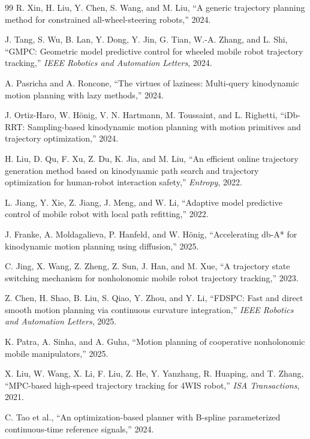 \begin{thebibliography}{99}
R. Xin, H. Liu, Y. Chen, S. Wang, and M. Liu, ``A generic trajectory planning method for constrained all-wheel-steering robots,'' 2024.

J. Tang, S. Wu, B. Lan, Y. Dong, Y. Jin, G. Tian, W.-A. Zhang, and L. Shi, ``GMPC: Geometric model predictive control for wheeled mobile robot trajectory tracking,'' \emph{IEEE Robotics and Automation Letters}, 2024.

A. Pasricha and A. Roncone, ``The virtues of laziness: Multi-query kinodynamic motion planning with lazy methods,'' 2024.

J. Ortiz-Haro, W. Hönig, V. N. Hartmann, M. Toussaint, and L. Righetti, ``iDb-RRT: Sampling-based kinodynamic motion planning with motion primitives and trajectory optimization,'' 2024.

H. Liu, D. Qu, F. Xu, Z. Du, K. Jia, and M. Liu, ``An efficient online trajectory generation method based on kinodynamic path search and trajectory optimization for human-robot interaction safety,'' \emph{Entropy}, 2022.

L. Jiang, Y. Xie, Z. Jiang, J. Meng, and W. Li, ``Adaptive model predictive control of mobile robot with local path refitting,'' 2022.

J. Franke, A. Moldagalieva, P. Hanfeld, and W. Hönig, ``Accelerating db-A* for kinodynamic motion planning using diffusion,'' 2025.

C. Jing, X. Wang, Z. Zheng, Z. Sun, J. Han, and M. Xue, ``A trajectory state switching mechanism for nonholonomic mobile robot trajectory tracking,'' 2023.

Z. Chen, H. Shao, B. Liu, S. Qiao, Y. Zhou, and Y. Li, ``FDSPC: Fast and direct smooth motion planning via continuous curvature integration,'' \emph{IEEE Robotics and Automation Letters}, 2025.

K. Patra, A. Sinha, and A. Guha, ``Motion planning of cooperative nonholonomic mobile manipulators,'' 2025.

X. Liu, W. Wang, X. Li, F. Liu, Z. He, Y. Yanzhang, R. Huaping, and T. Zhang, ``MPC-based high-speed trajectory tracking for 4WIS robot,'' \emph{ISA Transactions}, 2021.

C. Tao et al., ``An optimization-based planner with B-spline parameterized continuous-time reference signals,'' 2024.


\end{thebibliography}
